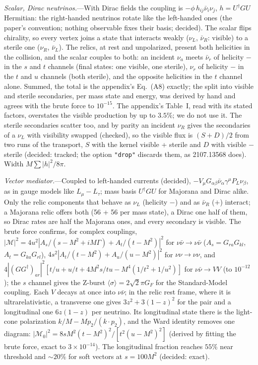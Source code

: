 \documentclass[11pt,a4paper]{article}
\begin{document}
\textit{Scalar, Dirac neutrinos.}---With Dirac fields the coupling is
$-\phi\,h_{ij}\bar\nu_i\nu_j$, $h = U^\dagger G U$ Hermitian: the right-handed neutrinos rotate
like the left-handed ones (the paper's convention; nothing observable fixes their basis; decided).
The scalar flips chirality, so every vertex joins a state that interacts weakly ($\nu_L$,
$\bar\nu_R$: visible) to a sterile one ($\nu_R$, $\bar\nu_L$). The relics, at rest and unpolarized,
present both helicities in the collision, and the scalar couples to both: an incident $\nu_a$ meets
$\bar\nu_r$ of helicity $-$ in the $s$ and $t$ channels (final states: one visible, one sterile),
$\nu_r$ of helicity $-$ in the $t$ and $u$ channels (both sterile), and the opposite helicities in
the $t$ channel alone. Summed, the total is the appendix's Eq.~(A8) exactly; the split into
visible and sterile secondaries, per mass state and energy, was derived by hand and agrees with the
brute force to $10^{-15}$. The appendix's Table~I, read with its stated factors, overstates the
visible production by up to $3.5\%$; we do not use it. The sterile secondaries scatter too, and by
parity an incident $\nu_R$ gives the secondaries of a $\nu_L$ with visibility swapped (checked), so
the visible flux is $(S+D)/2$ from two runs of the transport, $S$ with the kernel visible +
sterile and $D$ with visible $-$ sterile (decided: tracked; the option \texttt{"drop"} discards
them, as 2107.13568 does). Width $M\sum|h|^2/8\pi$.

\textit{Vector mediator.}---Coupled to left-handed currents (decided), $-V_\mu G_{\alpha\beta}
\bar\nu_\alpha\gamma^\mu P_L\nu_\beta$, as in gauge models like $L_\mu - L_\tau$; mass basis
$U^\dagger G U$ for Majorana and Dirac alike. Only the relic components that behave as $\nu_L$
(helicity $-$) and as $\bar\nu_R$ ($+$) interact; a Majorana relic offers both (56 + 56 per mass
state), a Dirac one half of them, so Dirac rates are half the Majorana ones, and every secondary is
visible. The brute force confirms, for complex couplings,
$|\mathcal M|^2 = 4u^2|A_s/(s - M^2 + iM\Gamma) + A_t/(t - M^2)|^2$ for $\nu\bar\nu\to\nu\bar\nu$
($A_s = G_{ra}G_{kl}$, $A_t = G_{ka}G_{rl}$), $4s^2|A_t/(t-M^2) + A_u/(u-M^2)|^2$ for $\nu\nu\to\nu\nu$,
and $4|(GG^\dagger)_{ar}|^2[t/u + u/t + 4M^2s/tu - M^4(1/t^2 + 1/u^2)]$ for $\nu\bar\nu\to VV$ (to
$10^{-12}$); the $s$ channel gives the Z-burst $\langle\sigma\rangle = 2\sqrt2\pi G_F$ for the
Standard-Model coupling. Each $V$ decays at once into $\nu\bar\nu$; in the relic rest frame, where it
is ultrarelativistic, a transverse one gives $3z^2 + 3(1-z)^2$ for the pair and a longitudinal one
$6z(1-z)$ per neutrino. Its longitudinal state there is the light-cone polarization
$k/M - Mp_2/(k\cdot p_2)$, and the Ward identity removes one diagram:
$|\mathcal M_0|^2 = 8sM^2(t - M^2)^2/[t^2(u - M^2)^2]$ (derived by fitting the brute force, exact
to $3\times10^{-14}$). The longitudinal fraction reaches $55\%$ near threshold and $\sim20\%$ for soft
vectors at $s = 100M^2$ (decided: exact).
\end{document}
